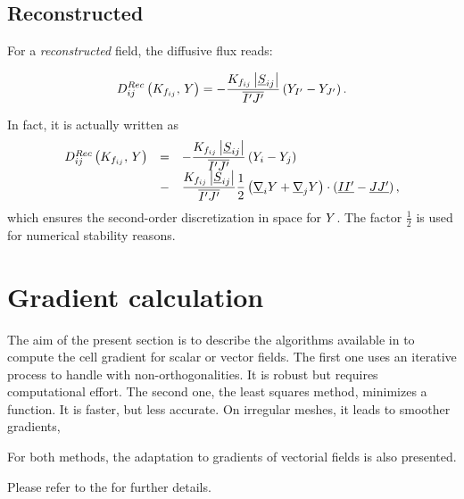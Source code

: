 \subsection{Reconstructed}
For a \emph{reconstructed} field, the diffusive flux reads:

\begin{equation}
D_{ij}^{Rec} \left( K_{f_{ij}} , \, Y \right)  =  - \dfrac{K_{f_{ij}} \left| \underline{S}_{ij} \right|}{\overline{{I^\prime} {J^\prime}} } \left( Y_{I^\prime} - Y_{J^\prime} \right).
\end{equation}

\begin{remark}
In fact, it is actually written as
%
\begin{equation}
\begin{array}{r c l}
D_{ij}^{Rec} \left( K_{f_{ij}} , \, Y \right)  &=&  - \dfrac{K_{f_{ij}} \left| \underline{S}_{ij} \right|}{\overline{{I^\prime} {J^\prime}} } \left( Y_i - Y_j \right) \\
&-& \dfrac{K_{f_{ij}} \left| \underline{S}_{ij} \right|}{\overline{{I^\prime} {J^\prime}} }  \dfrac{1}{2}\left( \underline{\nabla}_i Y + \underline{\nabla}_j Y \right) \cdot \left( \underline{I {I^\prime}} - \underline{J {J^\prime}} \right),
\end{array}
\end{equation}
%
which ensures the second-order discretization in space for $Y$.
The factor $ \frac{1}{2}$ is used for numerical stability reasons.
\end{remark}


\section{Gradient calculation}

\hypertarget{gradreco}{}

The aim of the present section is to describe the algorithms available in \CS
to compute the cell gradient for scalar or vector fields. The first one uses an
iterative process to handle with non-orthogonalities. It is robust but requires
computational effort. The second one, the least squares method, minimizes a
function. It is faster, but less accurate. On irregular meshes, it leads to
smoother gradients,

For both methods, the adaptation to gradients of vectorial fields is also presented.

Please refer to the  for further details.

